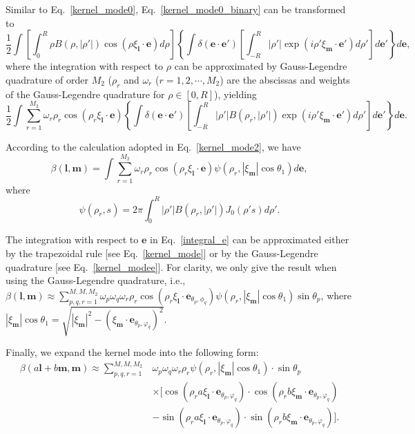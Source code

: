 Similar to Eq.~\eqref{kernel_mode0}, Eq.~\eqref{kernel_mode0_binary} can be transformed to
$$
\frac{1}{2}\int
              \left[\int_{0}^R\rho{}B(\rho,|\rho'|)\cos(\rho\xi_\textbf{l}\cdot{\textbf{e}})d\rho\right]  \left\{\int\delta(\textbf{e}\cdot{\textbf{e}'})\left[\int_{-R}^R|\rho'|\exp(i\rho'\xi_\textbf{m}\cdot{\textbf{e}'})d\rho'\right]d\textbf{e}'\right\}d\textbf{e}, 
$$
where the integration with respect to $\rho$ can be approximated by Gauss-Legendre quadrature of order $M_2$ ($\rho_r$ and $\omega_r$ ($r=1,2,\cdots,M_2$) are the abscissas and weights of the Gauss-Legendre quadrature for $\rho\in[0,R]$), yielding 
$$
\frac{1}{2}\int
          \sum_{r=1}^{M_2}\omega_r\rho_r\cos(\rho_r\xi_\textbf{l}\cdot{\textbf{e}}) \left\{\int \delta(\textbf{e}\cdot{\textbf{e}'})\left[\int_{-R}^R|\rho'|B(\rho_r,|\rho'|)\exp(i\rho'\xi_\textbf{m}\cdot{\textbf{e}'})d\rho'\right]d\textbf{e}'\right\}d\textbf{e}.
$$

According to the calculation adopted in Eq.~\eqref{kernel_mode2}, we have 
\begin{equation}\label{integral_e}
\beta(\textbf{l},\textbf{m})=\int
        \sum_{r=1}^{M_2}\omega_r\rho_r\cos(\rho_r\xi_\textbf{l}\cdot{\textbf{e}}) \psi(\rho_r,|\xi_\textbf{m}|\cos\theta_1)d\textbf{e},
\end{equation}
where 
\begin{equation}
\psi(\rho_r,s)=2\pi\int_0^R|\rho'|B(\rho_r,|\rho'|)J_0(\rho's)d\rho'.
\end{equation}

The integration with respect to $\textbf{e}$ in Eq.~\eqref{integral_e} can be approximated either by the trapezoidal rule [see Eq.~\eqref{kernel_mode}] or by the Gauss-Legendre quadrature [see Eq.~\eqref{kernel_modee}]. For clarity, we only give the result when using the Gauss-Legendre quadrature, i.e., $\beta(\textbf{l},\textbf{m})\approx
                        \sum_{p,q,r=1}^{M,M,M_2}\omega_p\omega_q\omega_r\rho_r
                        \cos(\rho_r\xi_\textbf{l}\cdot{\textbf{e}_{\theta_p,\phi_q}}) \psi(\rho_r,|\xi_\textbf{m}|\cos\theta_1)\sin\theta_p
$, 
where $|\xi_\textbf{m}|\cos\theta_1=\sqrt{|\xi_\textbf{m}|^2-(\xi_\textbf{m}\cdot{\textbf{e}}_{\theta_p,\varphi_q})^2}$.

Finally, we expand the kernel mode into the following form:
\begin{equation}
\begin{split}
\beta(a\textbf{l}+b\textbf{m},\textbf{m})\approx
      \sum_{p,q,r=1}^{M,M,M_2}&\omega_p\omega_q\omega_r\rho_r \psi(\rho_r,|\xi_\textbf{m}|\cos\theta_1)\cdot\sin\theta_p \\
   &\times [\cos(\rho_r{}a\xi_\textbf{l}\cdot{\textbf{e}}_{\theta_p,\varphi_q})\cdot
            \cos(\rho_r{}b\xi_\textbf{m}\cdot{\textbf{e}}_{\theta_p,\varphi_q})\\
             &- \sin(\rho_r{}a\xi_\textbf{l}\cdot{\textbf{e}}_{\theta_p,\varphi_q})\cdot\sin(\rho_r{}b\xi_\textbf{m}\cdot{\textbf{e}}_{\theta_p,\varphi_q}) ].
\end{split}
\end{equation}

